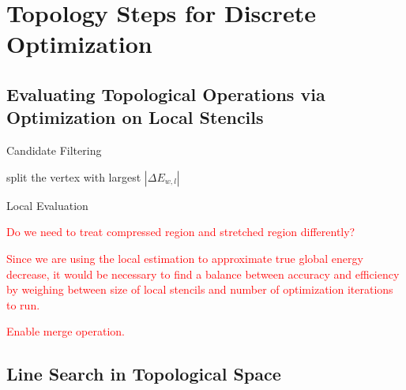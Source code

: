 \section{Topology Steps for Discrete Optimization}

\subsection{Evaluating Topological Operations via Optimization on Local Stencils}

\begin{algorithm}[h]
\SetAlgoLined
{}
\caption{Candidate Filtering}
\end{algorithm}

\begin{algorithm}[h]
\SetAlgoLined
{}
split the vertex with largest $|\Delta E_{w,l}|$
\caption{Local Evaluation}
\end{algorithm}

\textcolor{red}{
Do we need to treat compressed region and stretched region differently?
}

\textcolor{red}{
Since we are using the local estimation to approximate true global energy decrease, it would be necessary to find a balance between accuracy and efficiency by weighing between size of local stencils and number of optimization iterations to run.
}

\textcolor{red}{
Enable merge operation.
}

\subsection{Line Search in Topological Space}

